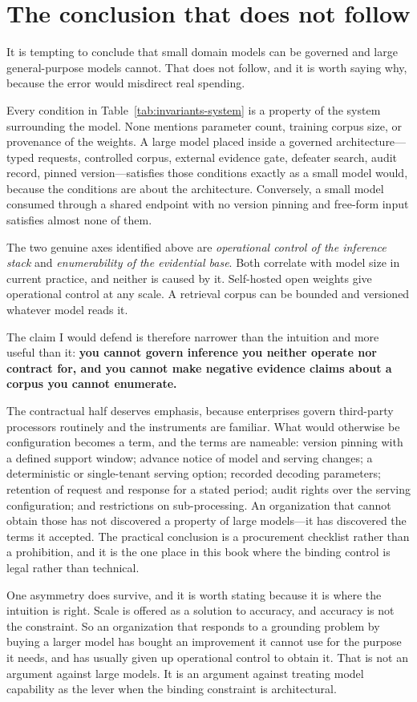 \section{The conclusion that does not follow}
\label{sec:not-follow}

It is tempting to conclude that small domain models can be governed and large
general-purpose models cannot. That does not follow, and it is worth saying why,
because the error would misdirect real spending.

Every condition in Table~\ref{tab:invariants-system} is a property of the system
surrounding the model. None mentions parameter count, training corpus size, or
provenance of the weights. A large model placed inside a governed architecture---typed
requests, controlled corpus, external evidence gate, defeater search, audit record,
pinned version---satisfies those conditions exactly as a small model would, because the
conditions are about the architecture. Conversely, a small model consumed through a
shared endpoint with no version pinning and free-form input satisfies almost none of
them.

The two genuine axes identified above are \emph{operational control of the inference
stack} and \emph{enumerability of the evidential base}. Both correlate with model
size in current practice, and neither is caused by it. Self-hosted open weights give
operational control at any scale. A retrieval corpus can be bounded and versioned
whatever model reads it.

The claim I would defend is therefore narrower than the intuition and more useful
than it: \textbf{you cannot govern inference you neither operate nor contract for, and
you cannot make negative evidence claims about a corpus you cannot enumerate.}

The contractual half deserves emphasis, because enterprises govern third-party
processors routinely and the instruments are familiar. What would otherwise be
configuration becomes a term, and the terms are nameable: version pinning with a
defined support window; advance notice of model and serving changes; a deterministic or
single-tenant serving option; recorded decoding parameters; retention of request and
response for a stated period; audit rights over the serving configuration; and
restrictions on sub-processing. An organization that cannot obtain those has not
discovered a property of large models---it has discovered the terms it accepted. The
practical conclusion is a procurement checklist rather than a prohibition, and it is
the one place in this book where the binding control is legal rather than technical.

One asymmetry does survive, and it is worth stating because it is where the intuition
is right. Scale is offered as a solution to accuracy, and accuracy is not the
constraint. So an organization that responds to a grounding problem by buying a larger
model has bought an improvement it cannot use for the purpose it needs, and has
usually given up operational control to obtain it. That is not an argument against
large models. It is an argument against treating model capability as the lever when
the binding constraint is architectural.
